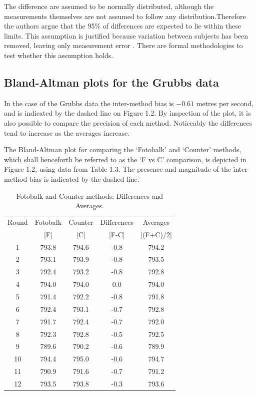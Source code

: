 \documentclass[12pt, a4paper]{report}
\theoremstyle{plain}
\theoremstyle{definition}
\theoremstyle{remark}
\begin{document}
		The difference are assumed to be normally distributed, although the measurements themselves are not assumed to follow any distribution.Therefore the authors argue that the 95\% of differences are expected to lie within these limits. This assumption is justified because variation between subjects has been removed, leaving only measurement error \citep{BA86}. There are formal methodologies to test whether this assumption holds.
		
		
	
	
	
	
	\subsection{Bland-Altman plots for the Grubbs data}
	In the case of the Grubbs data the inter-method bias is $-0.61$ metres per second, and is indicated by the dashed line on Figure 1.2. By inspection of the plot, it is also possible to compare the precision of each method. Noticeably the differences tend to increase as the averages increase.
	
	The Bland-Altman plot for comparing the `Fotobalk' and `Counter' methods, which shall henceforth be referred to as the `F vs C' comparison,  is depicted in Figure 1.2, using data from Table 1.3.
	The presence and magnitude of the inter-method bias is indicated by the dashed line.
	
	
	\begin{table}[h!]
		\renewcommand\arraystretch{0.7}%
		\begin{center}
			\begin{tabular}{|c||c|c||c|c|}
				\hline
				Round & Fotobalk  & Counter  & Differences  & Averages  \\
				&  [F] & [C] & [F-C] &  [(F+C)/2] \\
				\hline
				1 & 793.8 & 794.6 & -0.8 & 794.2 \\
				2 & 793.1 & 793.9 & -0.8 & 793.5 \\
				3 & 792.4 & 793.2 & -0.8 & 792.8 \\
				4 & 794.0 & 794.0 & 0.0 & 794.0 \\
				5 & 791.4 & 792.2 & -0.8 & 791.8 \\
				6 & 792.4 & 793.1 & -0.7 & 792.8 \\
				7 & 791.7 & 792.4 & -0.7 & 792.0 \\
				8 & 792.3 & 792.8 & -0.5 & 792.5 \\
				9 & 789.6 & 790.2 & -0.6 & 789.9 \\
				10 & 794.4 & 795.0 & -0.6 & 794.7 \\
				11 & 790.9 & 791.6 & -0.7 & 791.2 \\
				12 & 793.5 & 793.8 & -0.3 & 793.6 \\
				\hline
			\end{tabular}
			\caption{Fotobalk and Counter methods: Differences and Averages.}
		\end{center}
	\end{table}
	
\end{document}
